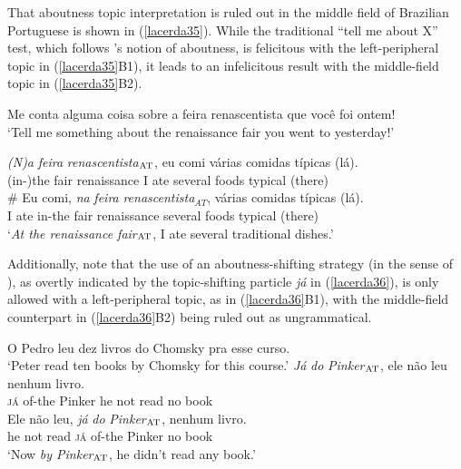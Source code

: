 \documentclass[output=paper]{langscibook}
\begin{document}
That aboutness topic interpretation is ruled out in the middle field of Brazilian Portuguese is shown in (\ref{lacerda35}). While the traditional “tell me about X” test, which follows \citet{Reinhart1981}'s notion of aboutness, is felicitous with the left-peripheral topic in (\ref{lacerda35}B1), it leads to an infelicitous result with the middle-field topic in (\ref{lacerda35}B2).

\begin{exe}
\ex \label{lacerda35}
\begin{xlist}
 \label{lacerda35A}
Me conta alguma coisa sobre a feira renascentista que você foi ontem!\\
‘Tell me something about the renaissance fair you went to yesterday!’

 \label{lacerda35B1}
\gll \emph{(N)a} 	\emph{feira} 	\emph{renascentista}$_{\textnormal{AT}}$, 	eu 	comi 	várias 	comidas 	típicas 	(lá).\\
(in-)the 	fair 	renaissance 	I 	ate 	several 	foods 	typical	(there)\\

 \label{lacerda35B2}
\gll \# Eu 	comi, 	\emph{na} 	\emph{feira} 	\emph{renascentista}$_{AT}$, 	várias 	comidas 	típicas	(lá).\\
{} I 	ate	in-the 	fair 	renaissance 	several	foods 	typical	(there)\\
\glt‘\emph{At the renaissance fair$_{\textnormal{AT}}$}, I ate several traditional dishes.’
\end{xlist}
\end{exe}

Additionally, note that the use of an aboutness-shifting strategy (in the sense of \citealt{BianchiFrascarelli2010}), as overtly indicated by the topic-shifting particle \emph{já} in (\ref{lacerda36}), is only allowed with a left-peripheral topic, as in (\ref{lacerda36}B1), with the middle-field counterpart in (\ref{lacerda36}B2) being ruled out as ungrammatical.

\begin{exe}
\ex \label{lacerda36}
\begin{xlist}
 \label{lacerda36A}
O Pedro leu dez livros do Chomsky pra esse curso.\\
‘Peter read ten books by Chomsky for this course.’
 \label{lacerda36B1}
\gll \emph{Já} 	\emph{do} 	\emph{Pinker}$_{\textnormal{AT}}$, 	ele 	não 	leu 	nenhum 	livro.\\
\textsc{já} 	of-the 	Pinker 	he 	not 	read 	no 	book\\

 \label{lacerda36B2}
\gll * Ele 	não 	leu, 	\emph{já} 	\emph{do} 	\emph{Pinker}$_{\textnormal{AT}}$, 	nenhum 	livro.\\
 {} he 	not 	read 	\textsc{já} 	of-the 	Pinker 	no 	book\\
\glt‘Now \emph{by Pinker}$_{\textnormal{AT}}$, he didn’t read any book.’
\end{xlist}
\end{exe}
\end{document}

